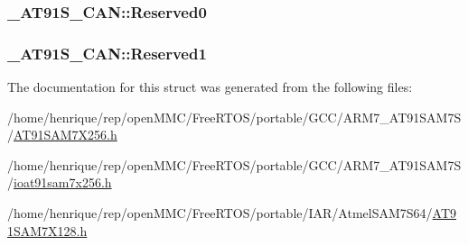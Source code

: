 \hypertarget{struct__AT91S__CAN_ad7db5c06f86189df26db1ff343078571}{
\subsubsection[{Reserved0}]{ \-\_\-\-A\-T91\-S\-\_\-\-C\-A\-N\-::\-Reserved0}}\label{struct__AT91S__CAN_ad7db5c06f86189df26db1ff343078571}
\hypertarget{struct__AT91S__CAN_aa484c0a5edaaa8a76f2d40990ddfb9b4}{
\subsubsection[{Reserved1}]{ \-\_\-\-A\-T91\-S\-\_\-\-C\-A\-N\-::\-Reserved1}}\label{struct__AT91S__CAN_aa484c0a5edaaa8a76f2d40990ddfb9b4}


The documentation for this struct was generated from the following files\-:\begin{DoxyCompactItemize}
\item 
/home/henrique/rep/open\-M\-M\-C/\-Free\-R\-T\-O\-S/portable/\-G\-C\-C/\-A\-R\-M7\-\_\-\-A\-T91\-S\-A\-M7\-S/\hyperlink{GCC_2ARM7__AT91SAM7S_2AT91SAM7X256_8h}{A\-T91\-S\-A\-M7\-X256.\-h}\item 
/home/henrique/rep/open\-M\-M\-C/\-Free\-R\-T\-O\-S/portable/\-G\-C\-C/\-A\-R\-M7\-\_\-\-A\-T91\-S\-A\-M7\-S/\hyperlink{ioat91sam7x256_8h}{ioat91sam7x256.\-h}\item 
/home/henrique/rep/open\-M\-M\-C/\-Free\-R\-T\-O\-S/portable/\-I\-A\-R/\-Atmel\-S\-A\-M7\-S64/\hyperlink{AT91SAM7X128_8h}{A\-T91\-S\-A\-M7\-X128.\-h}\end{DoxyCompactItemize}
